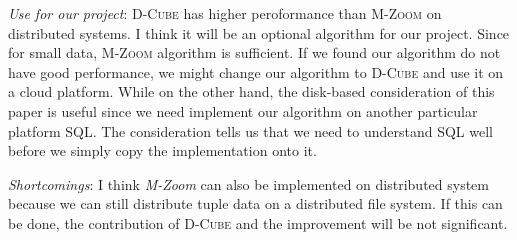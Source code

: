 \begin{itemize*}
\item {\em Use for our project}:
      \textsc{D-Cube} has higher peroformance than \textsc{M-Zoom} on distributed systems. I think it will be an optional algorithm for our project. Since for small data, \textsc{M-Zoom} algorithm is sufficient. If we found our algorithm do not have good performance, we might change our algorithm to \textsc{D-Cube} and use it on a cloud platform. While on the other hand, the disk-based consideration of this paper is useful since we need implement our algorithm on another particular platform SQL. The consideration tells us that we need to understand SQL well before we simply copy the implementation onto it.\\ 
      
\item {\em Shortcomings}:
     I think \textit{M-Zoom} can also be implemented on distributed system because we can still distribute tuple data on a distributed file system. If this can be done, the contribution of \textsc{D-Cube} and the improvement will be not significant.
      
\end{itemize*}


